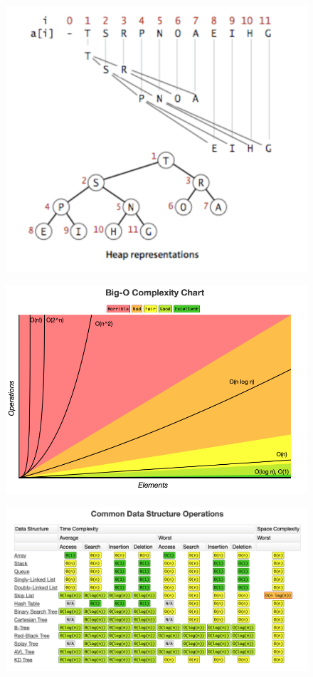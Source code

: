 \documentclass{article}
\begin{document}
\begin{figure}[!ht]
  \centering
  \includegraphics{Images/Heap.png}
  \label{fig:Heap}
\end{figure}

\begin{figure}[!ht]
  \includegraphics[width=\linewidth]{Images/BigO_Chart.png}
  \label{fig:Chart}
\end{figure}

\begin{figure}[!ht]
  \includegraphics[width=\linewidth]{Images/DataStrucOpt.png}
  \label{fig:Chart2}
\end{figure}
\end{document}
